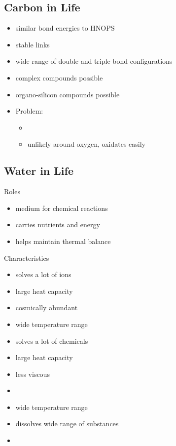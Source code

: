 \documentclass{article}
\theoremstyle{sltheorem}
\begin{document}
\subsection{Carbon in Life}
\begin{itemize}
    \item similar bond energies to HNOPS
    \item stable links
    \item wide range of double and triple bond configurations
\end{itemize}
\begin{itemize}
    \item complex compounds possible
    \item organo-silicon compounds possible
    \item Problem: 
    \begin{itemize}
        \item {}
        \item unlikely around oxygen, oxidates easily
    \end{itemize}
\end{itemize}
\subsection{Water in Life}
Roles
\begin{itemize}
    \item medium for chemical reactions
    \item carries nutrients and energy
    \item helps maintain thermal balance
\end{itemize}
Characteristics
\begin{itemize}
    \item solves a lot of ions
    \item large heat capacity
    \item cosmically abundant
    \item wide temperature range
\end{itemize}

\begin{itemize}
    \item solves a lot of chemicals
    \item large heat capacity
    \item less viscous 
    \item {}
\end{itemize}
\begin{itemize}
    \item wide temperature range
    \item dissolves wide range of substances
    \item {}
\end{itemize}
\end{document}
